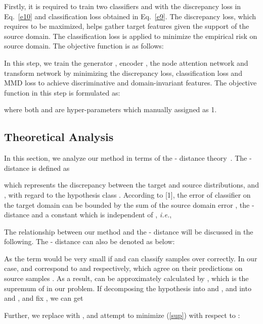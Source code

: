 \documentclass{article}
\newcommand*\ie{\textit{i.e.}}
\begin{document}
 Firstly, it is required to train two classifiers  and  with the discrepancy loss  in Eq.~\eqref{e10} and classification loss  obtained in Eq.~\eqref{e9}. The discrepancy loss, which requires to be maximized, helps gather target features given the support of the source domain. The classification loss is applied to minimize the empirical risk on source domain. The objective function is as follows:

 In this step, we train the generator , encoder , the node attention network  and transform network  by minimizing the discrepancy loss, classification loss and MMD loss to achieve discriminative and domain-invariant features. The objective function in this step is formulated as:

where both  and  are hyper-parameters which manually assigned as 1.



\subsection{Theoretical Analysis}

In this section, we analyze our method in terms of the - distance theory~\cite{proof_conver1}. The -distance is defined as 

which represents the discrepancy between the target and source distributions,  and , with regard to the hypothesis class . According to [1], the error of classifier  on the target domain  can be bounded by the sum of the source domain error , the - distance and a constant  which is independent of , \ie,

The relationship between our method and the - distance will be discussed in the following. The - distance can also be denoted as below:


As the term  would be very small if  and  can classify samples over  correctly. In our case,  and  correspond to  and  respectively, which agree on their predictions on source samples . As a result,  can be  approximately calculated by , which is the supremum of  in our problem. If decomposing the hypothesis  into  and , and  into  and , and fix , we can get

Further, we replace  with , and attempt to minimize (\ref{sup}) with respect to :
\end{document}
